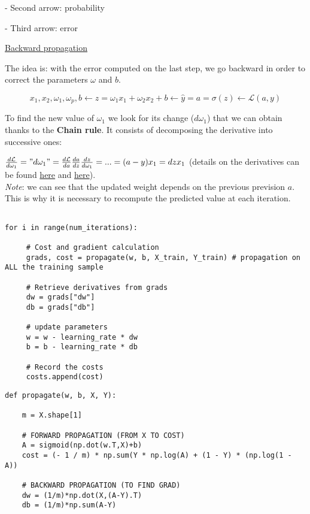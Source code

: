 - Second arrow: probability

- Third arrow: error

\vspace{5mm}

\underline{Backward propagation}

The idea is: with the error computed on the last step, we go backward in order to correct the parameters $\omega$ and $b$.

$$x_1,x_2, \omega_1,\omega_p,b \leftarrow z=\omega_1x_1 + \omega_2x_2 + b \leftarrow \widehat{y}=a=\sigma(z) \leftarrow \mathcal{L}(a,y)$$

To find the new value of $\omega_1$ we look for its change ($d \omega_1$) that we can obtain thanks to the \textbf{Chain rule}. It consists of decomposing the derivative into successive ones:

$\frac{d\mathcal{L}}{d\omega_1}="d\omega_1"=\frac{d\mathcal{L}}{da}\frac{da}{dz}\frac{dz}{d\omega_1}=...=(a-y)x_1=dzx_1$ (details on the derivatives can be found \href{https://www.youtube.com/watch?v=z_xiwjEdAC4}{here} and \href{https://www.youtube.com/watch?v=yXcQ4B-YSjQ}{here}). \\

\textit{Note}: we can see that the updated weight depends on the previous prevision $a$. This is why it is necessary to recompute the predicted value at each iteration.

\lstset{language=Python}
\lstset{frame=lines}
\lstset{basicstyle=\footnotesize}
\begin{lstlisting}

for i in range(num_iterations):
        
     # Cost and gradient calculation
     grads, cost = propagate(w, b, X_train, Y_train) # propagation on ALL the training sample
        
     # Retrieve derivatives from grads
     dw = grads["dw"]
     db = grads["db"]
        
     # update parameters
     w = w - learning_rate * dw
     b = b - learning_rate * db
        
     # Record the costs
     costs.append(cost)

\end{lstlisting}

\lstset{language=Python}
\lstset{frame=lines}
\lstset{basicstyle=\footnotesize}
\begin{lstlisting}
def propagate(w, b, X, Y):
    
    m = X.shape[1]
    
    # FORWARD PROPAGATION (FROM X TO COST)
    A = sigmoid(np.dot(w.T,X)+b)
    cost = (- 1 / m) * np.sum(Y * np.log(A) + (1 - Y) * (np.log(1 - A))
    
    # BACKWARD PROPAGATION (TO FIND GRAD)
    dw = (1/m)*np.dot(X,(A-Y).T)
    db = (1/m)*np.sum(A-Y)

\end{lstlisting}



\vspace{5mm}